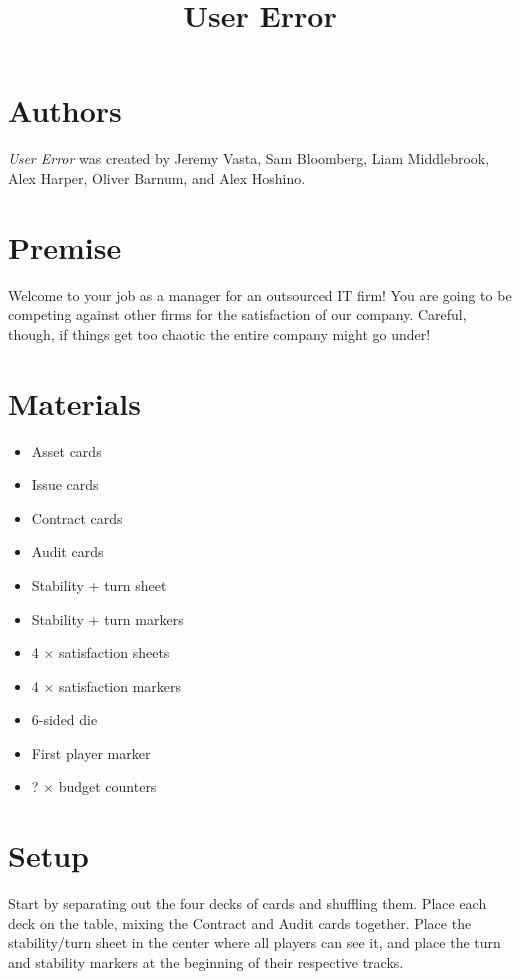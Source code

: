 \documentclass[twocolumn]{article}
\title{User Error}
\author{}
\date{}
\begin{document}
\maketitle

\section*{Authors}

\emph{User Error} was created by Jeremy Vasta, Sam Bloomberg, Liam Middlebrook, Alex Harper, Oliver Barnum, and Alex Hoshino.

\section*{Premise}

Welcome to your job as a manager for an outsourced IT firm! You are going to be competing against other firms for the satisfaction of our company. Careful, though, if things get too chaotic the entire company might go under!

\section*{Materials}

\begin{itemize}
	\item Asset cards
	\item Issue cards
	\item Contract cards
	\item Audit cards
	\item Stability + turn sheet
	\item Stability + turn markers
	\item 4 $\times$ satisfaction sheets
	\item 4 $\times$ satisfaction markers
	\item 6-sided die
	\item First player marker
	\item ? $\times$ budget counters
\end{itemize}

\pagebreak

\section*{Setup}

Start by separating out the four decks of cards and shuffling them. Place each deck on the table, mixing the Contract and Audit cards together. Place the stability/turn sheet in the center where all players can see it, and place the turn and stability markers at the beginning of their respective tracks.
\end{document}
